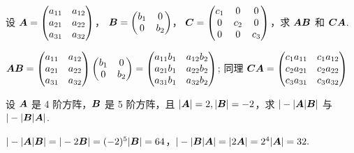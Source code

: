 \begin{example}
    设 $\vb*{A}=\begin{pmatrix}
            a_{11} & a_{12} \\
            a_{21} & a_{22} \\
            a_{31} & a_{32} \\
        \end{pmatrix}$，
    $\vb*{B}=\begin{pmatrix}
            b_1 & 0   \\
            0   & b_2
        \end{pmatrix}$，
    $\vb*{C}=\begin{pmatrix}
            c_1 & 0   & 0   \\
            0   & c_2 & 0   \\
            0   & 0   & c_3
        \end{pmatrix}$，求 $\vb*{AB}$ 和 $\vb*{CA}$.
\end{example}
\begin{solution}
    $\vb*{AB}=\begin{pmatrix}
            a_{11} & a_{12} \\
            a_{21} & a_{22} \\
            a_{31} & a_{32} \\
        \end{pmatrix}\begin{pmatrix}
            b_1 & 0   \\
            0   & b_2
        \end{pmatrix}=\begin{pmatrix}
            a_{11}b_1 & a_{12}b_2 \\
            a_{21}b_1 & a_{22}b_2 \\
            a_{31}b_1 & a_{32}b_2
        \end{pmatrix}$; 同理
    $\vb*{CA}=\begin{pmatrix}
            c_1a_{11} & c_1a_{12} \\
            c_2a_{21} & c_2a_{22} \\
            c_3a_{31} & c_3a_{32}
        \end{pmatrix}$
\end{solution}

\begin{example}
    设 $\vb*{A}$ 是 4 阶方阵，$\vb*{B}$ 是 5 阶方阵，且 $|\vb*{A}|=2,|\vb*{B}|=-2$，求 $|-|\vb*{A}|\vb*{B}|$ 与 $|-|\vb*{B}|\vb*{A}|$.
\end{example}
\begin{solution}
    $|-|\vb*{A}|\vb*{B}|=|-2\vb*{B}|=(-2)^{5}|\vb*{B}|=64$，$|-|\vb*{B}|\vb*{A}|=|2\vb*{A}|=2^4|\vb*{A}|=32.$
\end{solution}

